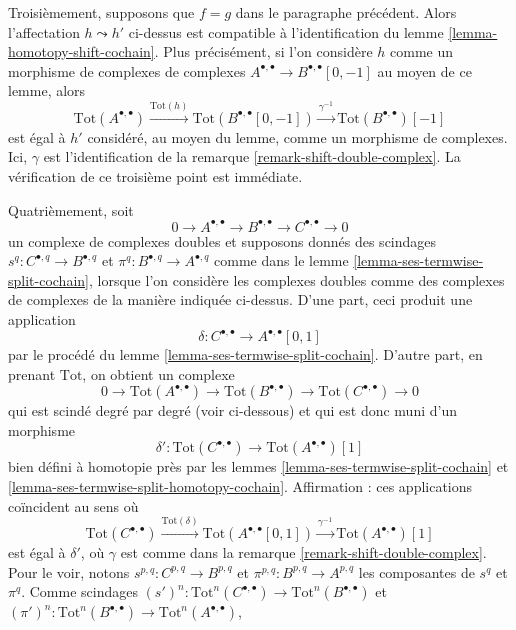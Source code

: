 \begin{remark}
\medskip\noindent
Troisièmement, supposons que $f = g$ dans le paragraphe précédent.
Alors l'affectation $h \leadsto h'$ ci-dessus est compatible à
l'identification du lemme \ref{lemma-homotopy-shift-cochain}.
Plus précisément, si l'on considère $h$ comme un morphisme de complexes
de complexes $A^{\bullet, \bullet} \to B^{\bullet, \bullet}[0, -1]$
au moyen de ce lemme, alors
$$
\text{Tot}(A^{\bullet, \bullet})
\xrightarrow{\text{Tot}(h)}
\text{Tot}(B^{\bullet, \bullet}[0, -1])
\xrightarrow{\gamma^{-1}}
\text{Tot}(B^{\bullet, \bullet})[-1]
$$
est égal à $h'$ considéré, au moyen du lemme, comme un morphisme de complexes.
Ici, $\gamma$ est l'identification de la
remarque \ref{remark-shift-double-complex}.
La vérification de ce troisième point est immédiate.

\medskip\noindent
Quatrièmement, soit
$$
0 \to A^{\bullet, \bullet} \to B^{\bullet, \bullet} \to
C^{\bullet, \bullet} \to 0
$$
un complexe de complexes doubles et supposons donnés des scindages
$s^q : C^{\bullet, q} \to B^{\bullet, q}$ et
$\pi^q : B^{\bullet, q} \to A^{\bullet, q}$
comme dans le lemme \ref{lemma-ses-termwise-split-cochain},
lorsque l'on considère les complexes doubles
comme des complexes de complexes de la manière indiquée ci-dessus.
D'une part, ceci produit une application
$$
\delta : C^{\bullet, \bullet} \longrightarrow A^{\bullet, \bullet}[0, 1]
$$
par le procédé du lemme \ref{lemma-ses-termwise-split-cochain}.
D'autre part, en prenant $\text{Tot}$, on obtient un complexe
$$
0 \to \text{Tot}(A^{\bullet, \bullet}) \to
\text{Tot}(B^{\bullet, \bullet}) \to
\text{Tot}(C^{\bullet, \bullet}) \to 0
$$
qui est scindé degré par degré (voir ci-dessous) et qui est donc muni d'un morphisme
$$
\delta' :
\text{Tot}(C^{\bullet, \bullet})
\longrightarrow
\text{Tot}(A^{\bullet, \bullet})[1]
$$
bien défini à homotopie près par les lemmes \ref{lemma-ses-termwise-split-cochain}
et \ref{lemma-ses-termwise-split-homotopy-cochain}. Affirmation :
ces applications coïncident au sens où
$$
\text{Tot}(C^{\bullet, \bullet})
\xrightarrow{\text{Tot}(\delta)}
\text{Tot}(A^{\bullet, \bullet}[0, 1]) \xrightarrow{\gamma^{-1}}
\text{Tot}(A^{\bullet, \bullet})[1]
$$
est égal à $\delta'$, où $\gamma$ est comme dans la
remarque \ref{remark-shift-double-complex}. Pour le voir, notons
$s^{p, q} : C^{p, q} \to B^{p, q}$ et
$\pi^{p, q} : B^{p, q} \to A^{p, q}$ les composantes de $s^q$ et $\pi^q$.
Comme scindages
$(s')^n : \text{Tot}^n(C^{\bullet, \bullet}) \to
\text{Tot}^n(B^{\bullet, \bullet})$
et
$(\pi')^n : \text{Tot}^n(B^{\bullet, \bullet}) \to
\text{Tot}^n(A^{\bullet, \bullet})$,

\end{remark}
